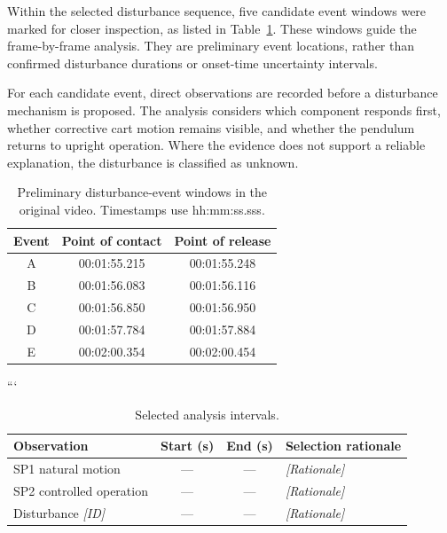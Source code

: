 \documentclass[11pt,a4paper]{article}
\newif\ifdraft
\DeclareRobustCommand{\guide}[1]{\ifdraft\par\smallskip\small\itshape Draft guidance: #1\par\smallskip\fi}
\newcommand{\manual}[1]{\cite[printed pp.~#1]{labmanual}}
\newcommand{\placeholder}[1]{\textit{[#1]}}
\begin{document}
Within the selected disturbance sequence, five candidate
event windows were marked for closer inspection, as listed
in Table~\ref{tab:disturbance-windows}.
These windows guide the frame-by-frame analysis.
They are preliminary event locations, rather than confirmed
disturbance durations or onset-time uncertainty intervals.

For each candidate event, direct observations are recorded
before a disturbance mechanism is proposed. The analysis
considers which component responds first, whether corrective
cart motion remains visible, and whether the pendulum returns
to upright operation. Where the evidence does not support a
reliable explanation, the disturbance is classified as unknown.
\manual{3--4, 17--20}

\begin{table}[htbp]
    \centering
    \small
    \caption{Preliminary disturbance-event windows in the
    original video. Timestamps use hh:mm:ss.sss.}
    \label{tab:disturbance-windows}
    \begin{tabular}{@{}ccc@{}}
        \toprule
        Event & Point of contact & Point of release \\
        \midrule
        A & 00:01:55.215 & 00:01:55.248 \\
        B & 00:01:56.083 & 00:01:56.116 \\
        C & 00:01:56.850 & 00:01:56.950 \\
        D & 00:01:57.784 & 00:01:57.884 \\
        E & 00:02:00.354 & 00:02:00.454 \\
        \bottomrule
    \end{tabular}
\end{table}
```

\begin{table}[htbp]
\centering
\caption{Selected analysis intervals.}
\label{tab:intervals2}
\begin{tabularx}{\linewidth}{@{}lccX@{}}
\toprule
Observation & Start (s) & End (s) & Selection rationale \\
\midrule
SP1 natural motion & --- & --- & \placeholder{Rationale} \\
SP2 controlled operation & --- & --- & \placeholder{Rationale} \\
Disturbance \placeholder{ID} & --- & --- & \placeholder{Rationale} \\
\bottomrule
\end{tabularx}
\end{table}
\guide{Duplicate the disturbance row for every actual event. TABLE III in the manual is an example, not evidence that there are exactly four events. Define each event's analysis endpoint so a later event does not contaminate its peak response. The endpoint convention is an assistant suggestion; fixed endpoints are not in manual. Sources: \manual{17--18}.}
\end{document}
